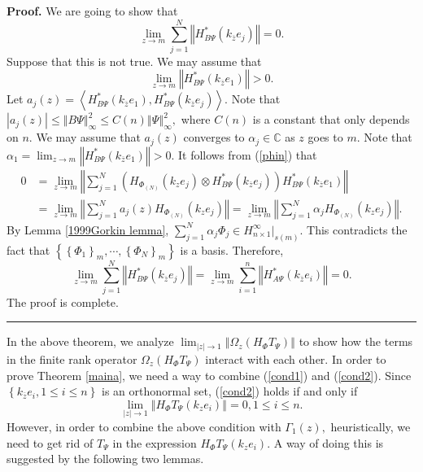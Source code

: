 \documentclass{article}%
\newenvironment{proof}[1][Proof]{\noindent\textbf{#1.} }{\ \rule{0.5em}{0.5em}}
\begin{document}
\begin{proof}
We are going to show that%
\[
\lim_{z\rightarrow m}\sum_{j=1}^{N}\left\Vert H_{B\Psi}^{\ast}\left(
k_{\overline{z}}e_{j}\right)  \right\Vert =0.
\]
Suppose that this is not true. We may assume that%
\[
\lim_{z\rightarrow m}\left\Vert H_{B\Psi}^{\ast}\left(  k_{\overline{z}}%
e_{1}\right)  \right\Vert >0.
\]
Let $a_{j}(z)=\left\langle H_{B\Psi}^{\ast}\left(  k_{\overline{z}}%
e_{1}\right)  ,H_{B\Psi}^{\ast}\left(  k_{\overline{z}}e_{j}\right)
\right\rangle $. Note that $\left\vert a_{j}(z)\right\vert \leq\left\Vert
B\Psi\right\Vert _{\infty}^{2}\leq C(n)\left\Vert \Psi\right\Vert _{\infty
}^{2},$ where $C(n)$ is a constant that only depends on $n$. We may assume
that $a_{j}(z)$ converges to $\alpha_{j}\in\mathbb{C}$ as $z$ goes to $m$.
Note that $\alpha_{1}=\lim_{z\rightarrow m}\left\Vert H_{B\Psi}^{\ast}\left(
k_{\overline{z}}e_{1}\right)  \right\Vert >0$. It follows from (\ref{phin})
that
\begin{align*}
0  &  =\lim_{z\rightarrow m}\left\Vert \sum_{j=1}^{N}\left(  H_{\Phi_{(N)}%
}\left(  k_{z}e_{j}\right)  \otimes H_{B\Psi}^{\ast}\left(  k_{\overline{z}%
}e_{j}\right)  \right)  H_{B\Psi}^{\ast}\left(  k_{\overline{z}}e_{1}\right)
\right\Vert \\
&  =\lim_{z\rightarrow m}\left\Vert \sum_{j=1}^{N}a_{j}(z)H_{\Phi_{(N)}%
}\left(  k_{z}e_{j}\right)  \right\Vert =\lim_{z\rightarrow m}\left\Vert
\sum_{j=1}^{N}\alpha_{j}H_{\Phi_{(N)}}\left(  k_{z}e_{j}\right)  \right\Vert .
\end{align*}
By Lemma \ref{1999Gorkin lemma}, $\sum_{j=1}^{N}\alpha_{j}\Phi_{j}\in
H_{n\times1}^{\infty}|_{s(m)}$. This contradicts the fact that $\left\{
\left\{  \Phi_{1}\right\}  _{m},\cdots,\left\{  \Phi_{N}\right\}
_{m}\right\}  $ is a basis. Therefore,%
\[
\lim_{z\rightarrow m}\sum_{j=1}^{N}\left\Vert H_{B\Psi}^{\ast}\left(
k_{\overline{z}}e_{j}\right)  \right\Vert =\lim_{z\rightarrow m}\sum_{i=1}%
^{n}\left\Vert H_{A\Psi}^{\ast}\left(  k_{\overline{z}}e_{i}\right)
\right\Vert =0.
\]
The proof is complete.
\end{proof}

In the above theorem, we analyze $\lim_{\left\vert z\right\vert \rightarrow
1}\left\Vert \Omega_{z}(H_{\Phi}T_{\Psi})\right\Vert $ to show how the terms
in the finite rank operator $\Omega_{z}(H_{\Phi}T_{\Psi})$ interact with each
other. In order to prove Theorem \ref{maina}, we need a way to combine
(\ref{cond1}) and (\ref{cond2}). Since $\left\{  k_{\overline{z}}e_{i},1\leq
i\leq n\right\}  $ is an orthonormal set, (\ref{cond2}) holds if and only if
\begin{equation}
\lim_{\left\vert z\right\vert \rightarrow1}\left\Vert H_{\Phi}T_{\Psi}\left(
k_{z}e_{i}\right)  \right\Vert =0,1\leq i\leq n. \label{cond2a}%
\end{equation}
However, in order to combine the above condition with $\Gamma_{1}(z),$
heuristically, we need to get rid of $T_{\Psi}$ in the expression $H_{\Phi
}T_{\Psi}\left(  k_{z}e_{i}\right)  .$ A way of doing this is suggested by the
following two lemmas.
\end{document}
